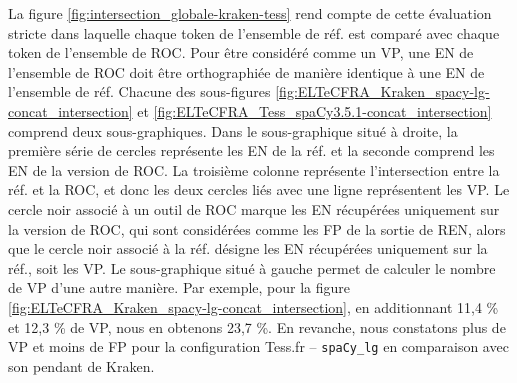 La figure \ref{fig:intersection_globale-kraken-tess} rend compte de cette évaluation stricte dans laquelle chaque token de l'ensemble de réf. est comparé avec chaque token de l'ensemble de ROC. Pour être considéré comme un VP, une EN de l'ensemble de ROC doit être orthographiée de manière identique à une EN de l'ensemble de réf. Chacune des sous-figures \ref{fig:ELTeCFRA_Kraken_spacy-lg-concat_intersection} et \ref{fig:ELTeCFRA_Tess_spaCy3.5.1-concat_intersection} comprend deux sous-graphiques. Dans le sous-graphique situé à droite, la première série de cercles représente les EN de la réf. et la seconde comprend les EN de la version de ROC. La troisième colonne représente l'intersection entre la réf. et la ROC, et donc les deux cercles liés avec une ligne représentent les VP. Le cercle noir associé à un outil de ROC marque les EN récupérées uniquement sur la version de ROC, qui sont considérées comme les FP de la sortie de REN, alors que le cercle noir associé à la réf. désigne les EN récupérées uniquement sur la réf., soit les VP. Le sous-graphique situé à gauche permet de calculer le nombre de VP d'une autre manière. Par exemple, pour la figure \ref{fig:ELTeCFRA_Kraken_spacy-lg-concat_intersection}, en additionnant 11,4 \% et 12,3 \% de VP, nous en obtenons 23,7 \%.
En revanche, nous constatons plus de VP et moins de FP pour la configuration Tess.fr -- \texttt{spaCy\_lg} en comparaison avec son pendant de Kraken.

